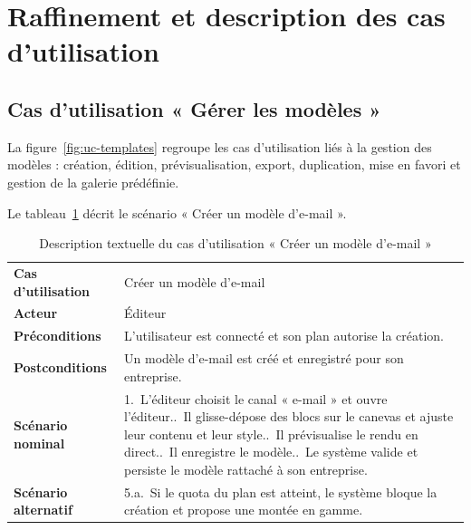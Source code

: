 \section{Raffinement et description des cas d'utilisation}

\subsection{Cas d'utilisation « Gérer les modèles »}
La figure~\ref{fig:uc-templates} regroupe les cas d'utilisation liés à la
gestion des modèles : création, édition, prévisualisation, export,
duplication, mise en favori et gestion de la galerie prédéfinie.


Le tableau~\ref{tab:uc-create-template} décrit le scénario « Créer un
modèle d'e-mail ».

\begin{table}[H]
\centering
\caption{Description textuelle du cas d'utilisation « Créer un modèle d'e-mail »}
\label{tab:uc-create-template}
\small
\begin{tabularx}{\linewidth}{lX}
\toprule
\textbf{Cas d'utilisation} & Créer un modèle d'e-mail \\
\textbf{Acteur} & Éditeur \\
\textbf{Préconditions} & L'utilisateur est connecté et son plan autorise la création. \\
\textbf{Postconditions} & Un modèle d'e-mail est créé et enregistré pour son entreprise. \\
\midrule
\textbf{Scénario nominal} &
1.~L'éditeur choisit le canal « e-mail » et ouvre l'éditeur.\newline
2.~Il glisse-dépose des blocs sur le canevas et ajuste leur contenu et leur style.\newline
3.~Il prévisualise le rendu en direct.\newline
4.~Il enregistre le modèle.\newline
5.~Le système valide et persiste le modèle rattaché à son entreprise. \\
\midrule
\textbf{Scénario alternatif} &
5.a.~Si le quota du plan est atteint, le système bloque la création et propose une montée en gamme. \\
\bottomrule
\end{tabularx}
\end{table}


